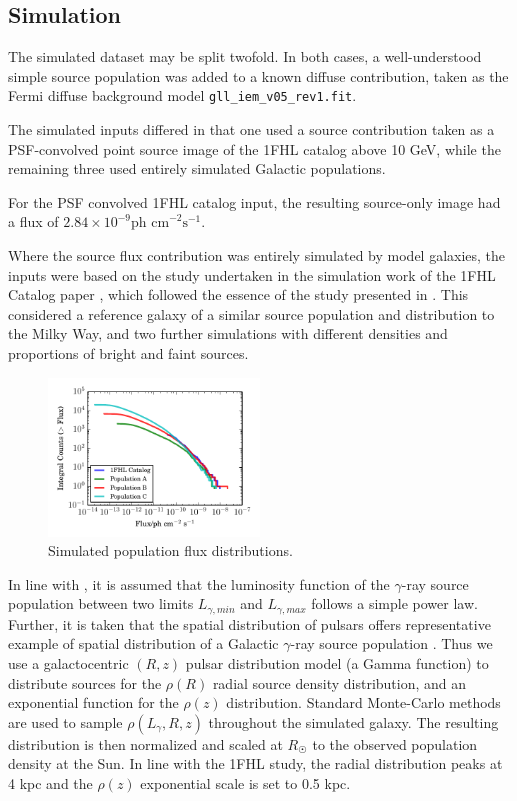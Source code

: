 \documentclass{PoS}
\begin{document}
\subsection{Simulation}

The simulated dataset may be split twofold. In both cases, a well-understood simple source population was added to a known diffuse contribution, taken as the Fermi diffuse background model \verb|gll_iem_v05_rev1.fit|.

The simulated inputs differed in that one used a source contribution taken as a PSF-convolved point source image of the 1FHL catalog above 10 GeV, while the remaining three used entirely simulated Galactic populations.

For the PSF convolved 1FHL catalog input, the resulting source-only image had a flux of $2.84\times 10^{-9} \text{ph cm}^{-2}\text{s}^{-1}$.

Where the source flux contribution was entirely simulated by model galaxies, the inputs were based on the study undertaken in the simulation work of the 1FHL Catalog paper \cite[p.59]{1fhl}, which followed the essence of the study presented in \cite{Strong}. This considered a reference galaxy of a similar source population and distribution to the Milky Way, and two further simulations with different densities and proportions of bright and faint sources.

\begin{figure}
\vspace{-10pt}
      \includegraphics[width=0.5\textwidth]{figures/log_N_log_S.pdf}
  \caption{Simulated population flux distributions.}
\vspace{-10pt}
\end{figure}

In line with \cite{Strong}, it is assumed that the luminosity function of the $\gamma$-ray source population between two limits $L_{\gamma, min}$ and $L_{\gamma, max}$ follows a simple power law. Further, it is taken that the spatial distribution of pulsars offers representative example of spatial distribution of a Galactic $\gamma$-ray source population \cite[p.2]{Strong}. Thus we use a galactocentric $(R, z)$ pulsar distribution model \cite[p.7]{Lorimer} (a Gamma function) to distribute sources for the $\rho(R)$ radial source density distribution, and an exponential function for the $\rho(z)$ distribution. Standard Monte-Carlo methods are used to sample $\rho(L_{\gamma}, R, z)$ throughout the simulated galaxy. The resulting distribution is then normalized and scaled at $R_{\astrosun}$ to the observed population density at the Sun. In line with the 1FHL study, the radial distribution peaks at 4 kpc and the $\rho(z)$ exponential scale is set to 0.5 kpc.
\end{document}
